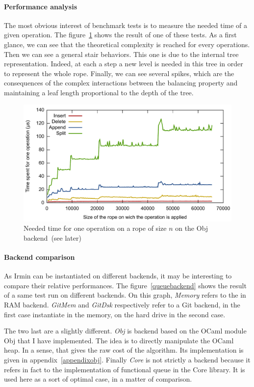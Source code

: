 \documentclass{article}
\newcommand{\irmin}{Irmin\xspace}
\newcommand{\git}{Git\xspace}
\newcommand{\obj}{Obj\xspace}
\newcommand{\ocaml}{OCaml\xspace}
\begin{document}
\paragraph{Performance analysis}
The most obvious interest of benchmark tests is to measure the needed time of a given operation.
The figure~\ref{ropeduration} shows the result of one of these tests.
As a first glance, we can see that the theoretical complexity is reached for every operations.
Then we can see a general stair behaviors.
This one is due to the internal tree representation.
Indeed, at each a step a new level is needed in this tree in order to represent the whole rope.
Finally, we can see several spikes, which are the consequences of the complex interactions between the balancing property and maintaining a leaf length proportional to the depth of the tree.

\begin{figure}[hbt]
\centering
\includegraphics[scale=0.6]{images/rope_duration.pdf}
\caption{Needed time for one operation on a rope of size $n$ on the \obj backend~(see later)}
\label{ropeduration}
\end{figure}

\paragraph{Backend comparison}
As \irmin can be instantiated on different backends, it may be interesting to compare their relative performances.
The figure~\ref{queuebackend} shows the result of a same test run on different backends.
On this graph, \emph{Memory} refers to the in RAM backend.
\emph{GitMem} and \emph{GitDsk} respectively refer to a \git backend, in the first case instantiate in the memory, on the hard drive in the second case.

The two last are a slightly different.
\emph{\obj} is backend based on the \ocaml module \obj that I have implemented.
The idea is to directly manipulate the \ocaml heap.
In a sense, that gives the raw cost of the algorithm.
Its implementation is given in appendix~\ref{appendixobj}.
Finally \emph{Core} is not strictly a backend because it refers in fact to the implementation of functional queue in the Core library.
It is used here as a sort of optimal case, in a matter of comparison.
\end{document}
